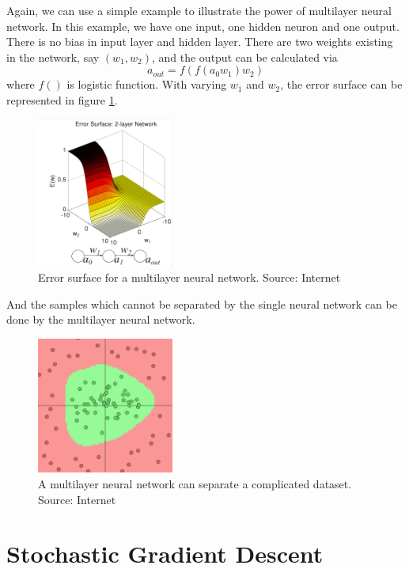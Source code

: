 Again, we can use a simple example to illustrate the power of multilayer neural network. In this example, we have one input, one hidden neuron and one output. There is no bias in input layer and hidden layer. There are two weights existing in the network, say $(w_{1}, w_{2})$, and the output can be calculated via
\begin{equation}\label{eq:2LayerExample}
a_{out} = f(f(a_{0}w_{1})w_{2})
\end{equation}
where $f()$ is logistic function. With varying $w_{1}$ and $w_{2}$, the error surface can be represented in figure \ref{fig:2LayerErrorSurface}.
\graphicspath{ {./Figures/} }
\begin{figure}[!htb]
\centering
\includegraphics[width=0.4\textwidth]{2LayerErrorSurface.png}
\caption{\label{fig:2LayerErrorSurface}Error surface for a multilayer neural network. Source: Internet}
\end{figure}
And the samples which cannot be separated by the single neural network can be done by the multilayer neural network.
\graphicspath{ {./Figures/} }
\begin{figure}[!htb]
\centering
\includegraphics[width=0.4\textwidth]{MultiLayerCircleData.png}
\caption{\label{fig:MultiLayerErrorSurface}A multilayer neural network can separate a complicated dataset. Source: Internet}
\end{figure}

\section{Stochastic Gradient Descent}

